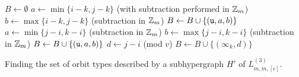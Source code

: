\begin{algorithm}
$B \gets \emptyset$\;
 {
     {
        $a \gets \min\{ i-k, j-k \}$ (with subtraction performed in $\mathbb{Z}_m$)\;
        $b \gets \max\{ i-k, j-k \}$ (subtraction in $\mathbb{Z}_m$)\;
        $B \gets B \cup \{ ({\tt u}, a, b) \}$ \;
    }  {
        $a \gets \min\{ j-i, k-i \}$ (subtraction in $\mathbb{Z}_m$)\;
        $b \gets \max\{ j-i, k-i \}$ (subtraction in $\mathbb{Z}_m$)\;
        $B \gets B \cup \{ ({\tt u}, a, b) \}$ \;
    }  {
        $d \gets j-i$ (mod $v$)\;
        $B \gets B \cup \{ (\infty_k, d) \}$ \;
    }
}
\;
\caption{Finding the set of orbit types described by a subhypergraph $H'$ of $L_{m,m,[\epsilon]}^{(3)}$.} \label{alg:candelabra-hypergraph-type}
\end{algorithm}

\newpage
